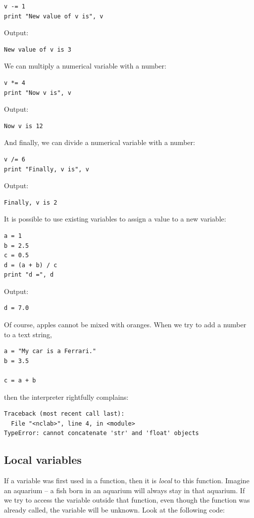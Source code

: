 \begin{verbatim}
v -= 1
print "New value of v is", v
\end{verbatim}
Output:

\begin{verbatim}
New value of v is 3
\end{verbatim}
We can multiply a numerical variable with a number:

\begin{verbatim}
v *= 4
print "Now v is", v
\end{verbatim}
Output:

\begin{verbatim}
Now v is 12
\end{verbatim}
And finally, we can divide a numerical variable with a number:

\begin{verbatim}
v /= 6
print "Finally, v is", v
\end{verbatim}
Output:

\begin{verbatim}
Finally, v is 2
\end{verbatim}
It is possible to use existing variables to assign a value to a new variable:

\begin{verbatim}
a = 1
b = 2.5
c = 0.5
d = (a + b) / c
print "d =", d
\end{verbatim}
Output:

\begin{verbatim}
d = 7.0
\end{verbatim}
Of course, apples cannot be mixed with oranges. When we try to 
add a number to a text string,

\begin{verbatim}
a = "My car is a Ferrari."
b = 3.5

c = a + b
\end{verbatim}
then the interpreter rightfully complains:

\begin{verbatim}
Traceback (most recent call last):
  File "<nclab>", line 4, in <module>
TypeError: cannot concatenate 'str' and 'float' objects
\end{verbatim}


\subsection{Local variables}

If a variable was first used in a function, then it is {\em local} to this 
function. Imagine an aquarium -- a fish born in an aquarium will always 
stay in that aquarium. If we try to access the variable outside that function,
even though the function was already called, the variable will be unknown. Look
at the following code:

